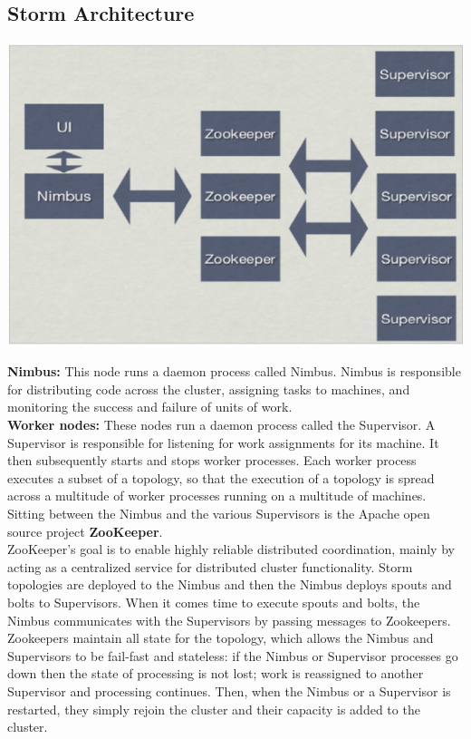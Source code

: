\subsection*{Storm Architecture} 
\begin{center}
\includegraphics[scale=.5]{../img/img5} \\[2mm]
\end{center}
{\bfseries Nimbus:} This node runs a daemon process called Nimbus. Nimbus is responsible for distributing code across the cluster, assigning tasks to machines, and monitoring the success and failure of units of work.\\[2mm]
{\bfseries Worker nodes:} These nodes run a daemon process called the Supervisor. A Supervisor is responsible for listening for work assignments for its machine. It then subsequently starts and stops worker processes. Each worker process executes a subset of a topology, so that the execution of a topology is spread across a multitude of worker processes running on a multitude of machines.\\[2mm]
Sitting between the Nimbus and the various Supervisors is the Apache open source project {\bfseries ZooKeeper}.\\[2mm] 
ZooKeeper's goal is to enable highly reliable distributed coordination, mainly by acting as a centralized service for distributed cluster functionality.
Storm topologies are deployed to the Nimbus and then the Nimbus deploys spouts and bolts to Supervisors. When it comes time to execute spouts and bolts, the Nimbus communicates with the Supervisors by passing messages to Zookeepers. Zookeepers maintain all state for the topology, which allows the Nimbus and Supervisors to be fail-fast and stateless: if the Nimbus or Supervisor processes go down then the state of processing is not lost; work is reassigned to another Supervisor and processing continues. Then, when the Nimbus or a Supervisor is restarted, they simply rejoin the cluster and their capacity is added to the cluster.
